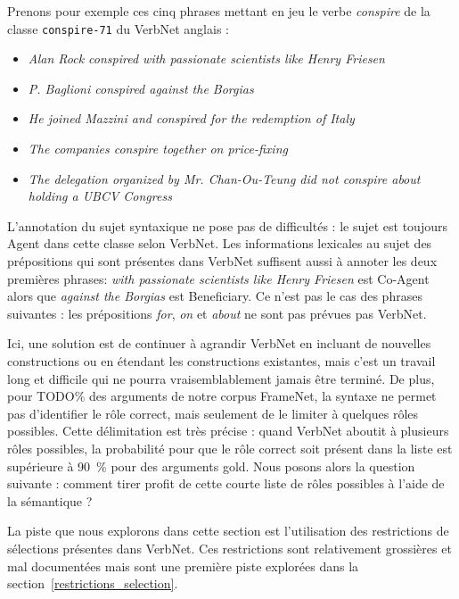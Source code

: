 
Prenons pour exemple ces cinq phrases mettant en jeu le verbe
\textit{conspire} de la classe \texttt{conspire-71} du VerbNet anglais :

\begin{itemize}
    \item \textit{Alan Rock conspired with passionate scientists like Henry Friesen}
    \item \textit{P. Baglioni conspired against the Borgias}
    \item \textit{He joined Mazzini and conspired for the redemption of Italy}
    \item \textit{The companies conspire together on price-fixing}
    \item \textit{The delegation organized by Mr. Chan-Ou-Teung did not conspire about holding a UBCV Congress}
\end{itemize}

L'annotation du sujet syntaxique ne pose pas de difficultés : le sujet est
toujours Agent dans cette classe selon VerbNet. Les informations lexicales au
sujet des prépositions qui sont présentes dans VerbNet suffisent aussi à
annoter les deux premières phrases: \textit{with passionate scientists like Henry
Friesen} est Co-Agent alors que \textit{against the Borgias} est Beneficiary. Ce
n'est pas le cas des phrases suivantes : les prépositions \textit{for}, \textit{on}
et \textit{about} ne sont pas prévues pas VerbNet.

Ici, une solution est de continuer à agrandir VerbNet en incluant de nouvelles
constructions ou en étendant les constructions existantes, mais c'est un
travail long et difficile qui ne pourra vraisemblablement jamais être terminé.
De plus, pour TODO\% des arguments de notre corpus FrameNet, la syntaxe ne
permet pas d'identifier le rôle correct, mais seulement de le limiter à
quelques rôles possibles. Cette délimitation est très précise : quand VerbNet
aboutit à plusieurs rôles possibles, la probabilité pour que le rôle correct
soit présent dans la liste est supérieure à 90~\% pour des arguments gold. Nous
posons alors la question suivante : comment tirer profit de cette courte liste
de rôles possibles à l'aide de la sémantique ?

La piste que nous explorons dans cette section est l'utilisation des
restrictions de sélections présentes dans VerbNet. Ces restrictions sont
relativement grossières et mal documentées mais sont une première piste
explorées dans la section~\ref{restrictions_selection}.

